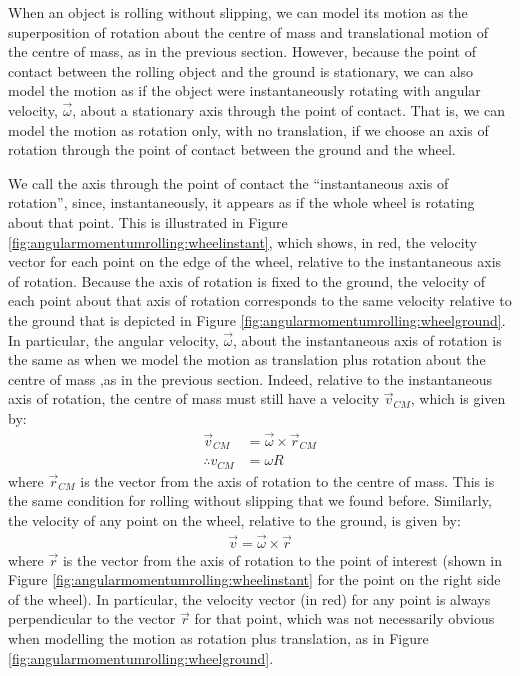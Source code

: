 When an object is rolling without slipping, we can model its motion as the superposition of rotation about the centre of mass and translational motion of the centre of mass, as in the previous section. However, because the point of contact between the rolling object and the ground is stationary, we can also model the motion as if the object were instantaneously rotating with angular velocity, $\vec \omega$, about a stationary axis through the point of contact. That is, we can model the motion as rotation only, with no translation, if we choose an axis of rotation through the point of contact between the ground and the wheel.

We call the axis through the point of contact the ``instantaneous axis of rotation'', since, instantaneously, it appears as if the whole wheel is rotating about that point. This is illustrated in Figure \ref{fig:angularmomentumrolling:wheelinstant}, which shows, in red, the velocity vector for each point on the edge of the wheel, relative to the instantaneous axis of rotation. Because the axis of rotation is fixed to the ground, the velocity of each point about that axis of rotation corresponds to the same velocity relative to the ground that is depicted in Figure \ref{fig:angularmomentumrolling:wheelground}.
In particular, the angular velocity, $\vec \omega$, about the instantaneous axis of rotation is the same as when we model the motion as translation plus rotation about the centre of mass ,as in the previous section. Indeed, relative to the instantaneous axis of rotation, the centre of mass must still have a velocity $\vec v_{CM}$, which is given by:
\begin{align*}
\vec v_{CM} &= \vec\omega \times \vec r_{CM}\\
\therefore v_{CM} &= \omega R
\end{align*}
where $\vec r_{CM}$ is the vector from the axis of rotation to the centre of mass. This is the same condition for rolling without slipping that we found before. Similarly, the velocity of any point on the wheel, relative to the ground, is given by:
\begin{align*}
\vec v = \vec\omega \times \vec r
\end{align*}
where $\vec r$ is the vector from the axis of rotation to the point of interest (shown in Figure \ref{fig:angularmomentumrolling:wheelinstant} for the point on the right side of the wheel). In particular, the velocity vector (in red) for any point is always perpendicular to the vector $\vec r$ for that point, which was not necessarily obvious when modelling the motion as rotation plus translation, as in Figure \ref{fig:angularmomentumrolling:wheelground}.
